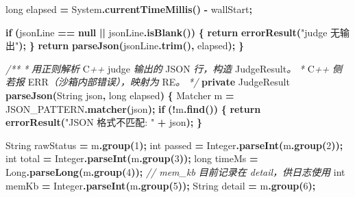 \documentclass[
  11pt,
]{ctexart}
\newenvironment{Shaded}{\begin{snugshade}}{\end{snugshade}}
\newcommand{\BuiltInTok}[1]{#1}
\newcommand{\CommentTok}[1]{\textcolor[rgb]{0.56,0.35,0.01}{\textit{#1}}}
\newcommand{\ControlFlowTok}[1]{\textcolor[rgb]{0.13,0.29,0.53}{\textbf{#1}}}
\newcommand{\DataTypeTok}[1]{\textcolor[rgb]{0.13,0.29,0.53}{#1}}
\newcommand{\DecValTok}[1]{\textcolor[rgb]{0.00,0.00,0.81}{#1}}
\newcommand{\FunctionTok}[1]{\textcolor[rgb]{0.13,0.29,0.53}{\textbf{#1}}}
\newcommand{\KeywordTok}[1]{\textcolor[rgb]{0.13,0.29,0.53}{\textbf{#1}}}
\newcommand{\NormalTok}[1]{#1}
\newcommand{\OperatorTok}[1]{\textcolor[rgb]{0.81,0.36,0.00}{\textbf{#1}}}
\newcommand{\StringTok}[1]{\textcolor[rgb]{0.31,0.60,0.02}{#1}}
\begin{document}
\begin{Shaded}
\begin{Highlighting}[]
        \DataTypeTok{long}\NormalTok{ elapsed }\OperatorTok{=} \BuiltInTok{System}\OperatorTok{.}\FunctionTok{currentTimeMillis}\OperatorTok{()} \OperatorTok{{-}}\NormalTok{ wallStart}\OperatorTok{;}

        \ControlFlowTok{if} \OperatorTok{(}\NormalTok{jsonLine }\OperatorTok{==} \KeywordTok{null} \OperatorTok{||}\NormalTok{ jsonLine}\OperatorTok{.}\FunctionTok{isBlank}\OperatorTok{())} \OperatorTok{\{}
            \ControlFlowTok{return} \FunctionTok{errorResult}\OperatorTok{(}\StringTok{"judge 无输出"}\OperatorTok{);}
        \OperatorTok{\}}
        \ControlFlowTok{return} \FunctionTok{parseJson}\OperatorTok{(}\NormalTok{jsonLine}\OperatorTok{.}\FunctionTok{trim}\OperatorTok{(),}\NormalTok{ elapsed}\OperatorTok{);}
    \OperatorTok{\}}

    \CommentTok{/**}
     \CommentTok{*} \CommentTok{用正则解析}\NormalTok{ C}\CommentTok{++}\NormalTok{ judge }\CommentTok{输出的}\NormalTok{ JSON }\CommentTok{行，构造}\NormalTok{ JudgeResult}\CommentTok{。}
     \CommentTok{*}\NormalTok{ C}\CommentTok{++} \CommentTok{侧若报}\NormalTok{ ERR}\CommentTok{（沙箱内部错误），映射为}\NormalTok{ RE}\CommentTok{。}
     \CommentTok{*/}
    \KeywordTok{private}\NormalTok{ JudgeResult }\FunctionTok{parseJson}\OperatorTok{(}\BuiltInTok{String}\NormalTok{ json}\OperatorTok{,} \DataTypeTok{long}\NormalTok{ elapsed}\OperatorTok{)} \OperatorTok{\{}
        \BuiltInTok{Matcher}\NormalTok{ m }\OperatorTok{=}\NormalTok{ JSON\_PATTERN}\OperatorTok{.}\FunctionTok{matcher}\OperatorTok{(}\NormalTok{json}\OperatorTok{);}
        \ControlFlowTok{if} \OperatorTok{(!}\NormalTok{m}\OperatorTok{.}\FunctionTok{find}\OperatorTok{())} \OperatorTok{\{}
            \ControlFlowTok{return} \FunctionTok{errorResult}\OperatorTok{(}\StringTok{"JSON 格式不匹配: "} \OperatorTok{+}\NormalTok{ json}\OperatorTok{);}
        \OperatorTok{\}}

        \BuiltInTok{String}\NormalTok{ rawStatus }\OperatorTok{=}\NormalTok{ m}\OperatorTok{.}\FunctionTok{group}\OperatorTok{(}\DecValTok{1}\OperatorTok{);}
        \DataTypeTok{int}\NormalTok{ passed  }\OperatorTok{=} \BuiltInTok{Integer}\OperatorTok{.}\FunctionTok{parseInt}\OperatorTok{(}\NormalTok{m}\OperatorTok{.}\FunctionTok{group}\OperatorTok{(}\DecValTok{2}\OperatorTok{));}
        \DataTypeTok{int}\NormalTok{ total   }\OperatorTok{=} \BuiltInTok{Integer}\OperatorTok{.}\FunctionTok{parseInt}\OperatorTok{(}\NormalTok{m}\OperatorTok{.}\FunctionTok{group}\OperatorTok{(}\DecValTok{3}\OperatorTok{));}
        \DataTypeTok{long}\NormalTok{ timeMs }\OperatorTok{=} \BuiltInTok{Long}\OperatorTok{.}\FunctionTok{parseLong}\OperatorTok{(}\NormalTok{m}\OperatorTok{.}\FunctionTok{group}\OperatorTok{(}\DecValTok{4}\OperatorTok{));}
        \CommentTok{// mem\_kb 目前记录在 detail，供日志使用}
        \DataTypeTok{int}\NormalTok{ memKb   }\OperatorTok{=} \BuiltInTok{Integer}\OperatorTok{.}\FunctionTok{parseInt}\OperatorTok{(}\NormalTok{m}\OperatorTok{.}\FunctionTok{group}\OperatorTok{(}\DecValTok{5}\OperatorTok{));}
        \BuiltInTok{String}\NormalTok{ detail }\OperatorTok{=}\NormalTok{ m}\OperatorTok{.}\FunctionTok{group}\OperatorTok{(}\DecValTok{6}\OperatorTok{);}


\end{Highlighting}
\end{Shaded}
\end{document}
